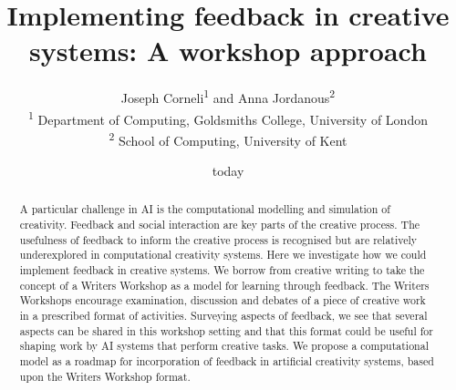 \documentclass[letter]{article}
\begin{document}
\title{Implementing feedback in creative systems: A workshop approach}

\author{Joseph Corneli\textsuperscript{1} and Anna Jordanous\textsuperscript{2}\\
\textsuperscript{1} Department of Computing, Goldsmiths College, University of London\\
\textsuperscript{2} School of Computing, University of Kent}

\date{today}

\maketitle

\begin{abstract} 
A particular challenge in AI is the computational modelling and simulation of creativity. Feedback and social interaction are key parts of the creative process. The usefulness of feedback to inform the creative process is recognised but are relatively underexplored in computational creativity systems. Here we investigate how we could implement feedback in creative systems. 
 We borrow from creative writing to take the concept of a Writers Workshop as a model for learning through feedback. The Writers Workshops encourage examination, discussion and debates of a piece of creative work in a prescribed format of activities. 
 Surveying aspects of feedback, we see that several aspects can be shared in this workshop setting and that this format could be useful for shaping work by AI systems that perform creative tasks. We propose a computational model as a roadmap for incorporation of feedback in artificial creativity systems, based upon the Writers Workshop format. 

\end{abstract}
\end{document}
